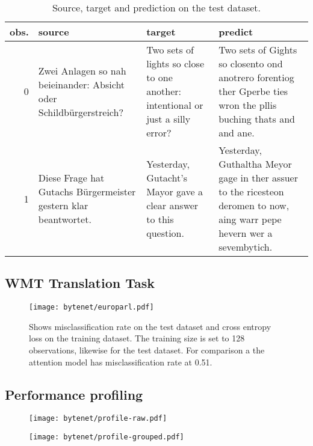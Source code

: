 \begin{table}[H]
\centering
\begin{tabular}{r|p{3.3cm} p{3.3cm} p{3.3cm}}
	obs. & source & target & predict\\ \hline
  0  & Zwei Anlagen so nah beieinander: Absicht oder Schildbürgerstreich? & Two sets of lights so close to one another: intentional or just a silly error? & Two sets of Gights so closento ond anotrero forentiog ther Gperbe ties wron the pllis buching thats and and ane. \\
  1 & Diese Frage hat Gutachs Bürgermeister gestern klar beantwortet. & Yesterday, Gutacht's Mayor gave a clear answer to this question. & Yesterday, Guthaltha Meyor gage in ther assuer to the ricesteon deromen to now, aing warr pepe hevern wer a sevembytich.
\end{tabular}
\caption{Source, target and prediction on the test dataset.}
\end{table}

\subsection{WMT Translation Task}

\begin{figure}[H]
    \centering
    \texttt{[image: bytenet/europarl.pdf]}
    \caption{Shows misclassification rate on the test dataset and cross entropy loss on the training dataset. The training size is set to 128 observations, likewise for the test dataset. For comparison a the attention model has misclassification rate at 0.51.}
\end{figure}

\subsection{Performance profiling}

\begin{figure}[H]
    \centering
    \texttt{[image: bytenet/profile-raw.pdf]}
    \caption{}
\end{figure}


\begin{figure}[H]
    \centering
    \texttt{[image: bytenet/profile-grouped.pdf]}
    \caption{}
\end{figure}
